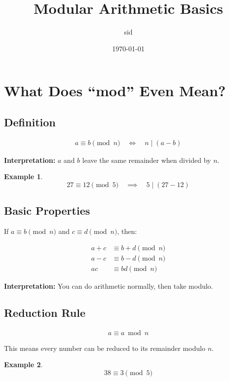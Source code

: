 \documentclass{article}
\title{Modular Arithmetic Basics}
\author{sid}
\date{\today}
\newtheorem{example}{Example}
\begin{document}
\maketitle

\section{What Does ``mod'' Even Mean?}

\subsection*{Definition}

\begin{align*}
    a \equiv b \pmod{n}
    \quad \iff \quad
    n \mid (a - b)
\end{align*}

\textbf{Interpretation:} $a$ and $b$ leave the same remainder when divided by $n$.

\begin{example}
\[
27 \equiv 12 \pmod{5}
\quad \implies \quad
5 \mid (27 - 12)
\]
\end{example}

\subsection*{Basic Properties}

If $a \equiv b \pmod{n}$ and $c \equiv d \pmod{n}$, then:

\begin{align*}
    a + c &\equiv b + d \pmod{n} \\
    a - c &\equiv b - d \pmod{n} \\
    ac    &\equiv bd \pmod{n}
\end{align*}

\textbf{Interpretation:}  
You can do arithmetic normally, then take modulo.

\subsection*{Reduction Rule}

\begin{align*}
    a \equiv a \bmod n
\end{align*}

This means every number can be reduced to its remainder modulo $n$.

\begin{example}
\[
38 \equiv 3 \pmod{5}
\]
\end{example}
\end{document}
